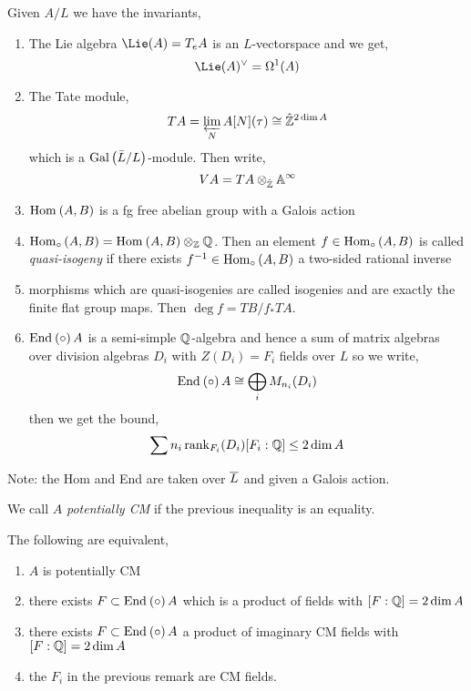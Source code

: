 \documentclass[12pt]{article}
\begin{document}
\begin{rmk}
Given $A/L$ we have the invariants,
\begin{enumerate}
\item The Lie algebra $\Lie(A) = T_e A$ is an $L$-vectorspace and we get,
\[ \Lie(A)^\vee = \Omega^1(A) \]
\item The Tate module,
\[ T A = \operatorname*{\varprojlim}_{N} A[N](\tau) \cong \hat{\mathbb{Z}}^{2 \dim{A}} \]
which is a $\mathrm{Gal}\left( \bar{L}/L \right)$-module. Then write,
\[ VA = TA \otimes_{\hat{\mathbb{Z}}} \mathbb{A}^{\infty} \]
\item $\mathrm{Hom}_{} \left( A, B \right)$ is a fg free abelian group with a Galois action
\item $\mathrm{Hom}_{\circ} \left( A, B \right) = \mathrm{Hom}_{} \left( A, B \right) \otimes_{\mathbb{Z}} \mathbb{Q}$. Then an element $f \in \mathrm{Hom}_{\circ} \left( A, B \right)$ is called \textit{quasi-isogeny} if there exists $f^{-1} \in \mathrm{Hom}_{\circ} \left( A, B \right)$ a two-sided rational inverse
\item morphisms which are quasi-isogenies are called isogenies and are exactly the finite flat group maps. Then $\deg{f} = T B / f_* T A$.
\item $\mathrm{End}_{} \left( \circ \right){A}$ is a semi-simple $\mathbb{Q}$-algebra and hence a sum of matrix algebras over division algebras $D_i$ with $Z(D_i) = F_i$ fields over $L$ so we write,
\[ \mathrm{End}_{} \left( \circ \right){A} \cong \bigoplus_i M_{n_i}(D_i) \]
then we get the bound,
\[ \sum n_i \operatorname{\mathrm{rank}}_{F_i}(D_i) [F_i : \mathbb{Q}] \le 2 \dim{A} \] 
\end{enumerate}
\end{rmk}

Note: the Hom and End are taken over $\overline{L}$ and given a Galois action.

\begin{defn}
We call $A$ \textit{potentially CM} if the previous inequality is an equality. 
\end{defn}

\begin{prop}
The following are equivalent,
\begin{enumerate}
\item $A$ is potentially CM
\item there exists $F \subset \mathrm{End}_{} \left( \circ \right){A}$ which is a product of fields with $[F : \mathbb{Q}] = 2 \dim{A}$ 
\item there exists $F \subset \mathrm{End}_{} \left( \circ \right){A}$ a product of imaginary CM fields with $[F : \mathbb{Q}] = 2 \dim{A}$ 
\item the $F_i$ in the previous remark are CM fields.
\end{enumerate}
\end{prop}
\end{document}
